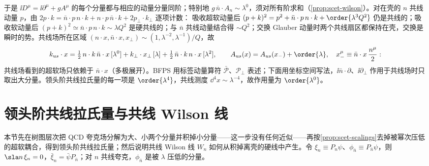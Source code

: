 于是 $\ii D^\mu=\ii\partial^\mu+gA^\mu$ 的每个分量都与相应的动量分量同阶；特别地 $g\,\bar n\cdot A_n\sim\lambda^0$，须对所有阶求和（\cref{prop:scet-wilson}）。对在壳的 $n$ 共线动量 $p$，由 $2p\cdot k=\bar n\cdot p\,n\cdot k+n\cdot p\,\bar n\cdot k+2p_\perp\cdot k_\perp$ 逐项计数：%
吸收超软动量后 $(p+k)^2=p^2+\bar n\cdot p\,n\cdot k+\order{\lambda^3Q^2}$ 仍是共线的；吸收软动量后 $(p+k)^2\simeq\bar n\cdot p\,n\cdot k\sim\lambda Q^2$ 是硬共线的；与 $\bar n$ 共线动量结合得 $\sim Q^2$；交换 Glauber 动量时两个共线扇区都保持在壳，交换是瞬时的势。共线场所在区域 $(n\cdot x,\bar n\cdot x,x_\perp)\sim(1,\lambda^{-2},\lambda^{-1})/Q$，故
\begin{equation}\label{eq:scet-multipole}
k_{us}\cdot x=\tfrac12\,n\cdot k\,\bar n\cdot x\,[\lambda^0]+k_\perp\cdot x_\perp\,[\lambda]+\tfrac12\,\bar n\cdot k\,n\cdot x\,[\lambda^2],\qquad
A_{us}(x)=A_{us}(x_-)+\order{\lambda},\quad x_-^\mu\equiv\bar n\cdot x\,\frac{n^\mu}{2}:
\end{equation}
共线场看到的超软场只依赖于 $\bar n\cdot x$（多极展开）。BFPS 用标签动量算符 $\bar{\mathcal P}$、$\mathcal P_\perp$ 表述\cite{BauerEtAl2001,BauerStewart2001}；下面用坐标空间写法\cite{BenekeEtAl2002,Beneke:2002ni}，$\ii\bar n\cdot\partial$、$\ii\partial_\perp$ 作用于共线场时只取出大分量。领头阶共线拉氏量的每一项是 $\order{\lambda^4}$，共线测度 $\dd^4x\sim\lambda^{-4}$，故作用量为 $\order{\lambda^0}$。

\section{领头阶共线拉氏量与共线 Wilson 线}\label{sec:scet-lagrangian}

本节先在树图层次把 QCD 夸克场分解为大、小两个分量并积掉小分量——这一步没有任何近似——再按\cref{prop:scet-scalings}去掉被幂次压低的超软耦合，得到领头阶共线拉氏量；然后说明共线 Wilson 线 $W_n$ 如何从积掉离壳的硬线中产生。令 $\xi_n\equiv P_n\psi$、$\phi_{\bar n}\equiv P_{\bar n}\psi$，则 $\sla n\,\xi_n=0$，$\bar\xi_n=\bar\psi P_{\bar n}$；对 $n$ 共线夸克，$\phi_{\bar n}$ 是被 $\lambda$ 压低的分量。

